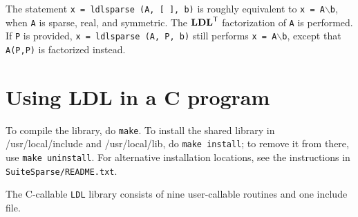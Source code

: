 \documentclass[12pt]{article}
\newcommand{\m}[1]{{\bf{#1}}}       %
\newcommand{\tr}{^{\sf T}}          %
\begin{document}
The statement {\tt x = ldlsparse (A, [ ], b)} is roughly equivalent to
{\tt x = A}$\backslash${\tt b}, when {\tt A} is sparse, real, and symmetric.
The $\m{LDL}\tr$ factorization of {\tt A} is performed.  If {\tt P} is
provided, {\tt x = ldlsparse (A, P, b)} still performs
{\tt x = A}$\backslash${\tt b}, except that {\tt A(P,P)} is factorized
instead.

\section{Using LDL in a C program}
\label{C}

To compile the library, do {\tt make}.  To install the shared library in
/usr/local/include and /usr/local/lib, do {\tt make install}; to remove it
from there, use {\tt make uninstall}.
For alternative installation locations, see the instructions in
{\tt SuiteSparse/README.txt}.

The C-callable {\tt LDL} library consists of nine user-callable routines
and one include file.
\end{document}
